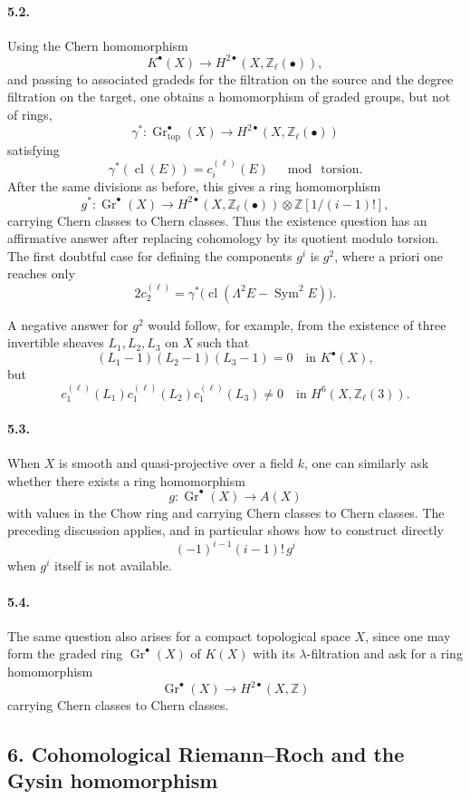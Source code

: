 \documentclass[12pt]{article}
\newcommand{\ZZ}{\mathbb Z}
\newcommand{\Gr}{\operatorname{Gr}}
\newcommand{\Sym}{\operatorname{Sym}}
\newcommand{\cl}{\operatorname{cl}}
\newcommand{\longto}{\longrightarrow}
\newcommand{\topf}{\mathrm{top}}
\begin{document}
\paragraph{5.2.}
Using the Chern homomorphism
\[
K^\bullet(X)\longto H^{2\bullet}(X,\ZZ_\ell(\bullet)),
\]
and passing to associated gradeds for the filtration on the source and the degree filtration on the target, one obtains a homomorphism of graded groups, but not of rings,
\[
\gamma^*:\Gr^\bullet_{\topf}(X)\longto H^{2\bullet}(X,\ZZ_\ell(\bullet))
\]
satisfying
\[
\gamma^*(\cl(E))=c_i^{(\ell)}(E)\quad\bmod\ \text{torsion}.
\]
After the same divisions as before, this gives a ring homomorphism
\[
g^*:\Gr^\bullet(X)\longto
H^{2\bullet}(X,\ZZ_\ell(\bullet))\otimes \ZZ[1/(i-1)!],
\]
carrying Chern classes to Chern classes. Thus the existence question has an affirmative answer after replacing cohomology by its quotient modulo torsion. The first doubtful case for defining the components $g^i$ is $g^2$, where a priori one reaches only
\[
2c_2^{(\ell)}=\gamma^*\bigl(\cl(\Lambda^2E-\Sym^2E)\bigr).
\]

A negative answer for $g^2$ would follow, for example, from the existence of three invertible sheaves $L_1,L_2,L_3$ on $X$ such that
\[
(L_1-1)(L_2-1)(L_3-1)=0\quad\text{in }K^\bullet(X),
\]
but
\[
c_1^{(\ell)}(L_1)c_1^{(\ell)}(L_2)c_1^{(\ell)}(L_3)\neq0
\quad\text{in }H^6(X,\ZZ_\ell(3)).
\]

\paragraph{5.3.}
When $X$ is smooth and quasi-projective over a field $k$, one can similarly ask whether there exists a ring homomorphism
\[
g:\Gr^\bullet(X)\longto A(X)
\]
with values in the Chow ring and carrying Chern classes to Chern classes. The preceding discussion applies, and in particular shows how to construct directly
\[
(-1)^{i-1}(i-1)!\,g^i
\]
when $g^i$ itself is not available.

\paragraph{5.4.}
The same question also arises for a compact topological space $X$, since one may form the graded ring $\Gr^\bullet(X)$ of $K(X)$ with its $\lambda$-filtration and ask for a ring homomorphism
\[
\Gr^\bullet(X)\longto H^{2\bullet}(X,\ZZ)
\]
carrying Chern classes to Chern classes.

\subsection*{6. Cohomological Riemann--Roch and the Gysin homomorphism}
\end{document}

